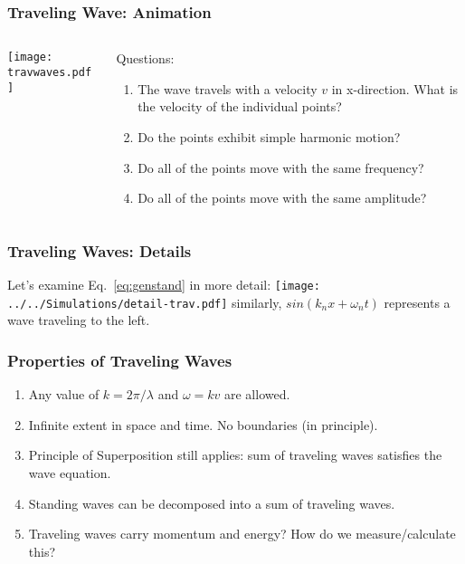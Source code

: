 \documentclass[pdf, handout, hideothersubsections]{beamer}
\begin{document}
\begin{frame}
\frametitle{Traveling Wave: Animation}
\begin{columns}
  \begin{column}{0.4\textwidth}
    \centering
    \texttt{[image: travwaves.pdf]}
  \end{column}
\begin{column}{0.6\textwidth}
Questions:
\begin{enumerate}
\item The wave travels with a velocity $v$ in x-direction. What is the
  velocity of the individual points?
\item Do the points exhibit simple harmonic motion?
\item Do all of the points move with the same frequency?
\item Do all of the points move with the same amplitude?
\end{enumerate}
\end{column}
\end{columns}

\end{frame}

\begin{frame}
\frametitle{Traveling Waves: Details}
Let's examine Eq.~\ref{eq:genstand} in more detail:
\pause
\texttt{[image: ../../Simulations/detail-trav.pdf]}
\pause
similarly, $sin(k_n x + \omega_n t)$ represents a wave traveling to
the left.

\end{frame}

\begin{frame}
\frametitle{Properties of Traveling Waves}
\begin{enumerate}
\item Any value of $k = 2 \pi / \lambda$ and $\omega = k v$ are allowed. 
\pause
\item Infinite extent in space and time. No boundaries (in principle).
\pause
\item Principle of Superposition still applies: sum of traveling waves
  satisfies the wave equation.
\pause
\item Standing waves can be decomposed into a sum of traveling waves.
\pause
\item Traveling waves carry momentum and energy? How do we
  measure/calculate this?
\end{enumerate}
\end{frame}
\end{document}
